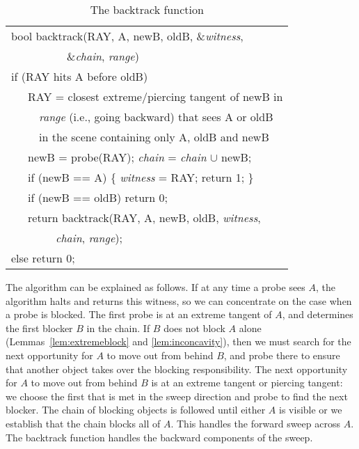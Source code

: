 \documentclass[10pt,twocolumn]{article}
\newif\ifJournal
\begin{document}
\begin{table}[h]
\caption{The backtrack function}
\label{table:back}
\vspace{.2in}
\begin{tabular}{|l|} \hline
bool backtrack(RAY, A, newB, oldB, \&{\em witness},\\
\ \ \ \ \ \ \ \ \ \ \&{\em chain}, {\em range}) \\[1em]

if (RAY hits A before oldB) \\
\ \ \ RAY = closest extreme/piercing tangent of newB in\\
\ \ \ \ \ {\em range} (i.e., going backward) that sees A or oldB\\
\ \ \ \ \ in the scene containing only A, oldB and newB\\
\ \ \ newB = probe(RAY); {\em chain} = {\em chain} $\cup$ newB;\\
\ \ \ if (newB == A) \{ {\em witness} = RAY; return 1; \}\\
\ \ \ if (newB == oldB) return 0;\\
\ \ \ return backtrack(RAY, A, newB, oldB, {\em witness},\\
\ \ \ \ \ \ \ \  {\em chain}, {\em range});\\
else return 0;\\
\hline
\end{tabular}
\end{table}

The algorithm can be explained as follows.
If at any time a probe sees $A$, the algorithm halts and returns this witness,
so we can concentrate on the case when a probe is blocked.
The first probe is at an extreme tangent of $A$, and determines the first blocker $B$
in the chain.
If $B$ does not block $A$ alone (Lemmas~\ref{lem:extremeblock} and \ref{lem:inconcavity}),
then we must search for the next opportunity for $A$ to move out from behind $B$,
and probe there to ensure that another object takes over the blocking responsibility.
The next opportunity for $A$ to move out from behind $B$ is at an extreme tangent
or piercing tangent: we choose the first that is met in the sweep direction
and probe to find the next blocker.
The chain of blocking objects is followed until either $A$ is visible or we establish that
the chain blocks all of $A$.
This handles the forward sweep across $A$.
The backtrack function handles the backward components of the sweep.
\end{document}
